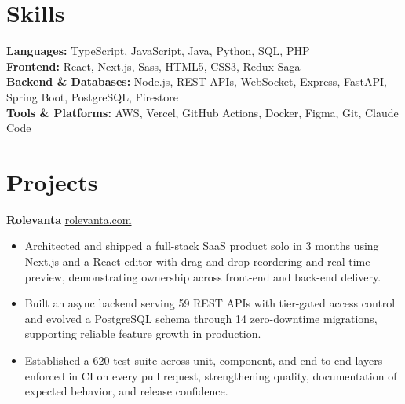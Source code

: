 \documentclass[11pt]{article}       %
\begin{document}
\vspace{-10.5pt}

\section*{Skills}
\textbf{Languages:} TypeScript, JavaScript, Java, Python, SQL, PHP \\
\textbf{Frontend:} React, Next.js, Sass, HTML5, CSS3, Redux Saga \\
\textbf{Backend \& Databases:} Node.js, REST APIs, WebSocket, Express, FastAPI, Spring Boot, PostgreSQL, Firestore \\
\textbf{Tools \& Platforms:} AWS, Vercel, GitHub Actions, Docker, Figma, Git, Claude Code
\vspace{-5pt}






\section*{Projects}
\textbf{Rolevanta} \hfill \href{https://rolevanta.com}{rolevanta.com} \\
\vspace{-9pt}
\begin{itemize}
  \item Architected and shipped a full-stack SaaS product solo in 3 months using Next.js and a React editor with drag-and-drop reordering and real-time preview, demonstrating ownership across front-end and back-end delivery.
  \item Built an async backend serving 59 REST APIs with tier-gated access control and evolved a PostgreSQL schema through 14 zero-downtime migrations, supporting reliable feature growth in production.
  \item Established a 620-test suite across unit, component, and end-to-end layers enforced in CI on every pull request, strengthening quality, documentation of expected behavior, and release confidence.
\end{itemize}
\end{document}

